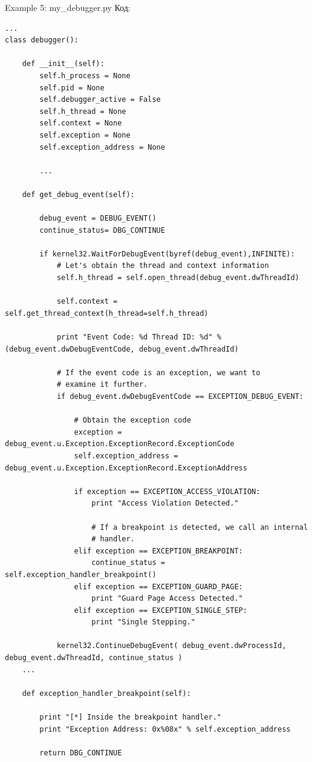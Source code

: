 \documentclass[12pt]{book}
\begin{document}
Example 5: my\_debugger.py
Код:
\begin{lstlisting}
...
class debugger():

    def __init__(self):
        self.h_process = None
        self.pid = None
        self.debugger_active = False
        self.h_thread = None
        self.context = None
        self.exception = None
        self.exception_address = None

        ...

    def get_debug_event(self):

        debug_event = DEBUG_EVENT()
        continue_status= DBG_CONTINUE

        if kernel32.WaitForDebugEvent(byref(debug_event),INFINITE):
            # Let's obtain the thread and context information
            self.h_thread = self.open_thread(debug_event.dwThreadId)

            self.context = self.get_thread_context(h_thread=self.h_thread)

            print "Event Code: %d Thread ID: %d" % (debug_event.dwDebugEventCode, debug_event.dwThreadId)

            # If the event code is an exception, we want to
            # examine it further.
            if debug_event.dwDebugEventCode == EXCEPTION_DEBUG_EVENT:

                # Obtain the exception code
                exception = debug_event.u.Exception.ExceptionRecord.ExceptionCode
                self.exception_address = debug_event.u.Exception.ExceptionRecord.ExceptionAddress

                if exception == EXCEPTION_ACCESS_VIOLATION:
                    print "Access Violation Detected."

                    # If a breakpoint is detected, we call an internal
                    # handler.
                elif exception == EXCEPTION_BREAKPOINT:
                    continue_status = self.exception_handler_breakpoint()
                elif exception == EXCEPTION_GUARD_PAGE:
                    print "Guard Page Access Detected."
                elif exception == EXCEPTION_SINGLE_STEP:
                    print "Single Stepping."

            kernel32.ContinueDebugEvent( debug_event.dwProcessId, debug_event.dwThreadId, continue_status )
    ...

    def exception_handler_breakpoint(self):

        print "[*] Inside the breakpoint handler."
        print "Exception Address: 0x%08x" % self.exception_address

        return DBG_CONTINUE
\end{lstlisting}
\end{document}
